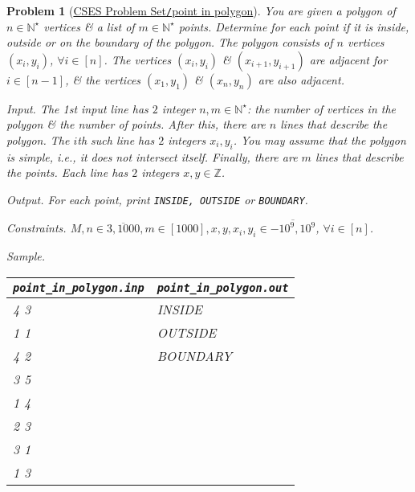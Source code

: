 \documentclass{article}
\newtheorem{problem}{Problem}
\begin{document}
\begin{problem}[\href{https://cses.fi/problemset/task/2192}{CSES Problem Set{\tt/}point in polygon}]
    You are given a polygon of $n\in\mathbb{N}^\star$ vertices \& a list of $m\in\mathbb{N}^\star$ points. Determine for each point if it is inside, outside or on the boundary of the polygon. The polygon consists of $n$ vertices $(x_i,y_i)$, $\forall i\in[n]$. The vertices $(x_i,y_i)$ \& $(x_{i+1},y_{i+1})$ are adjacent for $i\in[n - 1]$, \& the vertices $(x_1,y_1)$ \& $(x_n,y_n)$ are also adjacent.
    \item {\sf Input.} The 1st input line has $2$ integer $n,m\in\mathbb{N}^\star$: the number of vertices in the polygon \& the number of points. After this, there are $n$ lines that describe the polygon. The $i$th such line has $2$ integers $x_i,y_i$. You may assume that the polygon is simple, i.e., it does not intersect itself. Finally, there are $m$ lines that describe the points. Each line has $2$ integers $x,y\in\mathbb{Z}$.
    \item {\sf Output.} For each point, print {\tt INSIDE, OUTSIDE} or {\tt BOUNDARY}.
    \item {\sf Constraints.} $M,n\in\overline{3,1000},m\in[1000],x,y,x_i,y_i\in\overline{-10^9,10^9}$, $\forall i\in[n]$.
    \item {\sf Sample.}
    \begin{table}[H]
        \centering
        \begin{tabular}{|l|l|}
            \hline
            \verb|point_in_polygon.inp| & \verb|point_in_polygon.out| \\
            \hline
            4 3 & INSIDE \\
            1 1 & OUTSIDE \\
            4 2 & BOUNDARY \\
            3 5 & \\
            1 4 & \\
            2 3 & \\
            3 1 & \\
            1 3 & \\
            \hline
        \end{tabular}
    \end{table}
\end{problem}
\end{document}
